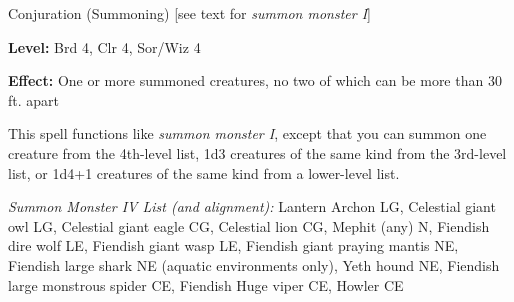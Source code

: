 
Conjuration (Summoning) [see text for \textit{summon monster I}]

\textbf{Level:} Brd 4, Clr 4, Sor/Wiz 4

\textbf{Effect:} One or more summoned creatures, no two of which can be more than 
30 ft. apart

This spell functions like \textit{summon monster I}, except that you can summon 
one creature from the 4th-level list, 1d3 creatures of the same kind from the 3rd-level 
list, or 1d4+1 creatures of the same kind from a lower-level list.

\textit{Summon Monster IV List (and alignment):} Lantern Archon LG, Celestial giant owl LG, Celestial giant eagle CG, Celestial lion CG, Mephit (any) N, Fiendish dire wolf LE, Fiendish giant wasp LE, Fiendish giant praying mantis NE, Fiendish large shark NE (aquatic environments only), Yeth hound NE, Fiendish large monstrous spider CE, Fiendish Huge viper CE, Howler CE
